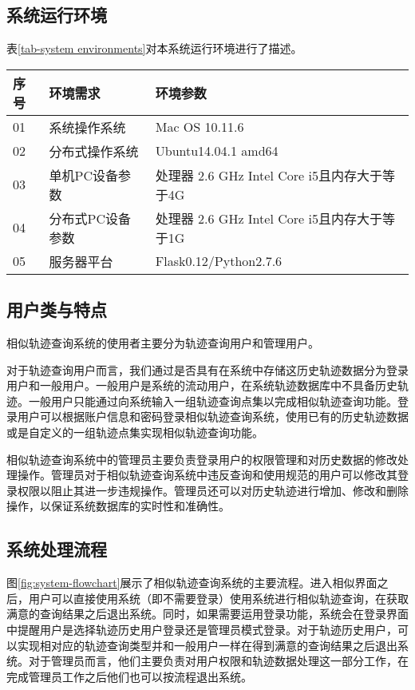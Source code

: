 \subsection{系统运行环境}
\label{subsec:system environment}

表\ref{tab-system environments}对本系统运行环境进行了描述。
\begin{table}[!htpb]
  	\centering
		\begin{tabular}{ |p{1cm}|p{3.5cm}|p{8.5cm}| }
		\hline
		序号 & 环境需求 & 环境参数 \\
		\hline
		01 & 系统操作系统 & Mac OS 10.11.6  \\
		\hline
		02 & 分布式操作系统 & Ubuntu14.04.1 amd64  \\
		\hline
		03 & 单机PC设备参数 & 处理器 2.6 GHz Intel Core i5且内存大于等于4G\\
		\hline
		04 & 分布式PC设备参数 & 处理器 2.6 GHz Intel Core i5且内存大于等于1G\\
		\hline
		05 & 服务器平台 & Flask0.12/Python2.7.6 \\
		\hline
		\end{tabular}
\end{table}

\subsection{用户类与特点}
\label{subsec:user characteristics}
相似轨迹查询系统的使用者主要分为轨迹查询用户和管理用户。

对于轨迹查询用户而言，我们通过是否具有在系统中存储这历史轨迹数据分为登录用户和一般用户。一般用户是系统的流动用户，在系统轨迹数据库中不具备历史轨迹。一般用户只能通过向系统输入一组轨迹查询点集以完成相似轨迹查询功能。登录用户可以根据账户信息和密码登录相似轨迹查询系统，使用已有的历史轨迹数据或是自定义的一组轨迹点集实现相似轨迹查询功能。

相似轨迹查询系统中的管理员主要负责登录用户的权限管理和对历史数据的修改处理操作。管理员对于相似轨迹查询系统中违反查询和使用规范的用户可以修改其登录权限以阻止其进一步违规操作。管理员还可以对历史轨迹进行增加、修改和删除操作，以保证系统数据库的实时性和准确性。

\subsection{系统处理流程}
图\ref{fig:system-flowchart}展示了相似轨迹查询系统的主要流程。进入相似界面之后，用户可以直接使用系统（即不需要登录）使用系统进行相似轨迹查询，在获取满意的查询结果之后退出系统。同时，如果需要运用登录功能，系统会在登录界面中提醒用户是选择轨迹历史用户登录还是管理员模式登录。对于轨迹历史用户，可以实现相对应的轨迹查询类型并和一般用户一样在得到满意的查询结果之后退出系统。对于管理员而言，他们主要负责对用户权限和轨迹数据处理这一部分工作，在完成管理员工作之后他们也可以按流程退出系统。

